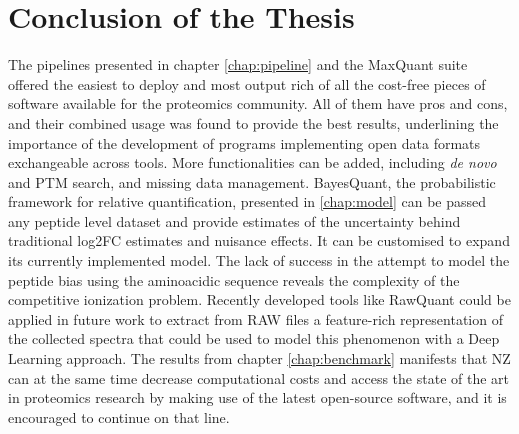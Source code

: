 \documentclass[11pt, a4paper]{report}
\begin{document}
\let\oldthebibliography\thebibliography
\let\endoldthebibliography\endthebibliography
\renewenvironment{thebibliography}[1]{
  \begin{oldthebibliography}{#1}
    \setlength{\itemsep}{0em}
    \setlength{\parskip}{0em}
}
{
  \end{oldthebibliography}
}









\chapter*{Conclusion of the Thesis}
\label{chap:conclusion}

The pipelines presented in chapter \ref{chap:pipeline} and the MaxQuant suite offered the easiest to deploy and most output rich of all the cost-free pieces of software available for the proteomics community. All of them have pros and cons, and their combined usage was found to provide the best results, underlining the importance of the development of programs implementing open data formats exchangeable across tools. More functionalities can be added, including \textit{de novo} and \ac{PTM} search, and missing data management. BayesQuant, the probabilistic framework for relative quantification, presented in \ref{chap:model} can be passed any peptide level dataset and provide estimates of the uncertainty behind traditional \ac{log2FC} estimates and nuisance effects. It can be customised to expand its currently implemented model. The lack of success in the attempt to model the peptide bias using the aminoacidic sequence reveals the complexity of the competitive ionization problem. Recently developed tools like RawQuant could be applied in future work to extract from RAW files a feature-rich representation of the collected spectra that could be used to model this phenomenon with a Deep Learning approach. The results from chapter \ref{chap:benchmark} manifests that \ac{NZ} can at the same time decrease computational costs and access the state of the art in proteomics research by making use of the latest open-source software, and it is encouraged to continue on that line.






\printbibliography
\end{document}
